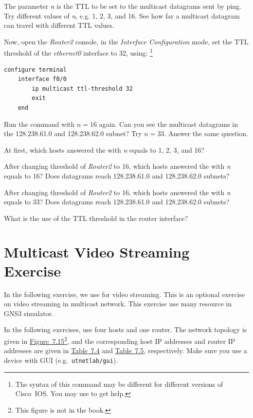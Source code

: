 \documentclass{../UTNetLab}
\begin{document}
The parameter \textit{n} is the TTL to be set to the multicast datagrams sent by ping.
Try different values of \textit{n}, e.g. 1, 2, 3, and 16.
See how far a multicast datagram can travel with different TTL values.

Now, open the \textit{Router2} console, in the \textit{Interface Configuration} mode, set the TTL threshold of the \textit{ethernet0} interface to 32, using:
\footnote{The syntax of this command may be different for different versions of Cisco~IOS.
    You may use  to get help.}

\begin{lstlisting}    
configure terminal
    interface f0/0
        ip multicast ttl-threshold 32
        exit
    end
\end{lstlisting}

Run the  command with $n = 16$ again.
Can you see the multicast datagrams in the 128.238.61.0 and 128.238.62.0 subnet?
Try $n = 33$.
Answer the same question.

\begin{report}
    \item At first, which hosts answered the  with \textit{n} equals to 1, 2, 3, and 16?
    \item After changing threshold of \textit{Router2} to 16, which hosts answered the  with \textit{n} equals to 16?
    Does datagrams reach 128.238.61.0 and 128.238.62.0 subnets?
    \item After changing threshold of \textit{Router2} to 16, which hosts answered the  with \textit{n} equals to 33?
    Does datagrams reach 128.238.61.0 and 128.238.62.0 subnets?

    \item What is the use of the TTL threshold in the router interface?
\end{report}

\part{Multicast Video Streaming Exercise}\label{sec:multicast-streaming}
In the following exercise, we use  for video streaming.
This is an optional exercise on video streaming in multicast network.
This exercise use many resource in GNS3 simulator.

In the following exercises, use four hosts and one router. The network topology is given in \hyperref[fig:7.15]{Figure~7.15}\footnote{This figure is not in the book.}, and the corresponding host IP addresses and router IP addresses are given in \hyperref[tab:7.4]{Table~7.4} and \hyperref[tab:7.5]{Table~7.5}, respectively.
Make sure you use a device with GUI (e.g.\ \texttt{utnetlab/gui}).
\end{document}
